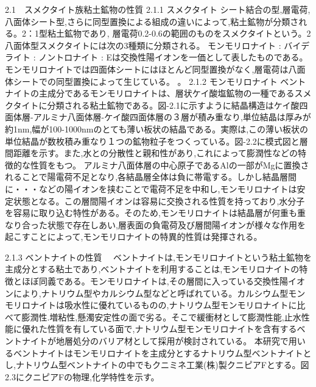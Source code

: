 2.1　スメクタイト族粘土鉱物の性質
 2.1.1 スメクタイト
  シート結合の型,層電荷,八面体シート型,さらに同型置換による組成の違いによって,粘土鉱物が分類される。2：1型粘土鉱物であり, 層電荷0.2-0.6の範囲のものをスメクタイトという。2八面体型スメクタイトには次の3種類に分類される。
モンモリロナイト :
バイデライト     :
ノントロナイト   :
Eは交換性陽イオンを一価として表したものである。モンモリロナイトでは四面体シートにはほとんど同型置換がなく,層電荷は八面体シートでの同型置換によって生じている。
。 
2.1.2 モンモリロナイト
ベントナイトの主成分であるモンモリロナイトは、層状ケイ酸塩鉱物の一種であるスメクタイトに分類される粘土鉱物である。図-2.1に示すように結晶構造はケイ酸四面体層-アルミナ八面体層-ケイ酸四面体層の３層が積み重なり,単位結晶は厚みが約1nm,幅が100-1000nmのとても薄い板状の結晶である。実際は,この薄い板状の単位結晶が数枚積み重なり１つの鉱物粒子をつくっている。図-2.2に模式図と層間距離を示す。また,水との分散性と親和性があり,これによって膨潤性などの特徴的な性質をもつ。
アルミナ八面体層の中心原子であるAlの一部がMgに置換されることで陽電荷不足となり,各結晶層全体は負に帯電する。しかし結晶層間に・・・などの陽イオンを挟むことで電荷不足を中和し,モンモリロナイトは安定状態となる。この層間陽イオンは容易に交換される性質を持っており,水分子を容易に取り込む特性がある。そのため,モンモリロナイトは結晶層が何重も重なり合った状態で存在しあい,層表面の負電荷及び層間陽イオンが様々な作用を起こすことによって,モンモリロナイトの特異的性質は発揮される。


2.1.3 ベントナイトの性質
　ベントナイトは,モンモリロナイトという粘土鉱物を主成分とする粘土であり,ベントナイトを利用することは,モンモリロナイトの特徴とほぼ同義である。モンモリロナイトは,その層間に入っている交換性陽イオンにより,ナトリウム型やカルシウム型などと呼ばれている。カルシウム型モンモリロナイトは吸水性に優れているものの,ナトリウム型モンモリロナイトに比べて膨潤性.増粘性,懸濁安定性の面で劣る。そこで緩衝材として膨潤性能,止水性能に優れた性質を有している面で,ナトリウム型モンモリロナイトを含有するベントナイトが地層処分のバリア材として採用が検討されている。
本研究で用いるベントナイトはモンモリロナイトを主成分とするナトリウム型ベントナイトとし,ナトリウム型ベントナイトの中でもクニミネ工業(株)製クニピアFとする。図2.3にクニピアFの物理,化学特性を示す。


